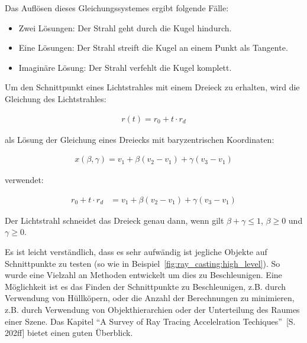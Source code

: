 Das Auflösen dieses Gleichungssystemes ergibt folgende Fälle:
\begin{itemize}
    \item{Zwei Lösungen}: Der Strahl geht durch die Kugel hindurch.
    \item{Eine Lösungen}: Der Strahl streift die Kugel an einem Punkt
        als Tangente.
    \item{Imaginäre Lösung}: Der Strahl verfehlt die Kugel komplett.
\end{itemize}

Um den Schnittpunkt eines Lichtstrahles mit einem Dreieck zu erhalten,
wird die Gleichung des Lichtstrahles:

\begin{gather}
    r(t) = r_{0} + t \cdot r_{d}
\end{gather}

als Lösung der Gleichung eines Dreiecks mit baryzentrischen Koordinaten:

\begin{gather}
    x(\beta, \gamma) = v_{1} + \beta(v_{2} - v_{1}) + \gamma(v_{3} - v_{1})
\end{gather}

verwendet:

\begin{align}
    r_{0} + t \cdot r_{d} &= v_{1} + \beta(v_{2} - v_{1}) + \gamma(v_{3} - v_{1})
\end{align}

Der Lichtstrahl schneidet das Dreieck genau dann, wenn gilt $\beta +
\gamma \le 1$, $\beta \ge 0$ und $\gamma \ge 0$.

Es ist leicht verständlich, dass es sehr aufwändig ist jegliche Objekte
auf Schnittpunkte zu testen (so wie in
Beispiel~\ref{fig:ray_casting:high_level}). So wurde eine Vielzahl an
Methoden entwickelt um dies zu Beschleunigen. Eine Möglichkeit ist es
das Finden der Schnittpunkte zu Beschleunigen, z.B. durch Verwendung von
Hüllköpern, oder die Anzahl der Berechnungen zu minimieren, z.B. durch
Verwendung von Objekthierarchien oder der Unterteilung des Raumes einer
Szene. Das Kapitel ``A Survey of Ray Tracing Accelelration
Techiques''~\cite{glassner_introduction_1989}[S. 202ff] bietet einen
guten Überblick.

